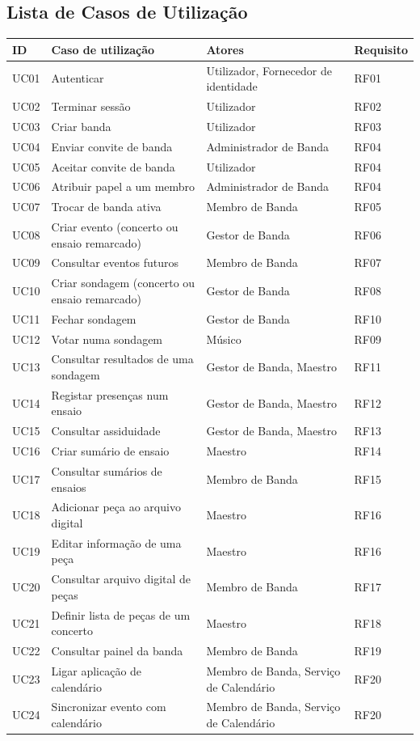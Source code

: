 \subsection{Lista de Casos de Utilização}
\begin{longtable}{|p{1.4cm}|p{5cm}|p{4.6cm}|p{2cm}|}
\hline
\textbf{ID} & \textbf{Caso de utilização} & \textbf{Atores} & \textbf{Requisito} \\ \hline
\endhead
UC01 & Autenticar & Utilizador, Fornecedor de identidade & RF01 \\ \hline
UC02 & Terminar sessão & Utilizador & RF02 \\ \hline
UC03 & Criar banda & Utilizador & RF03 \\ \hline
UC04 & Enviar convite de banda & Administrador de Banda & RF04 \\ \hline
UC05 & Aceitar convite de banda & Utilizador & RF04 \\ \hline
UC06 & Atribuir papel a um membro & Administrador de Banda & RF04 \\ \hline
UC07 & Trocar de banda ativa & Membro de Banda & RF05 \\ \hline
UC08 & Criar evento (concerto ou ensaio remarcado) & Gestor de Banda & RF06 \\ \hline
UC09 & Consultar eventos futuros & Membro de Banda & RF07 \\ \hline
UC10 & Criar sondagem (concerto ou ensaio remarcado) & Gestor de Banda & RF08 \\ \hline
UC11 & Fechar sondagem & Gestor de Banda & RF10 \\ \hline
UC12 & Votar numa sondagem & Músico & RF09 \\ \hline
UC13 & Consultar resultados de uma sondagem & Gestor de Banda, Maestro & RF11 \\ \hline
UC14 & Registar presenças num ensaio & Gestor de Banda, Maestro & RF12 \\ \hline
UC15 & Consultar assiduidade & Gestor de Banda, Maestro & RF13 \\ \hline
UC16 & Criar sumário de ensaio & Maestro & RF14 \\ \hline
UC17 & Consultar sumários de ensaios & Membro de Banda & RF15 \\ \hline
UC18 & Adicionar peça ao arquivo digital & Maestro & RF16 \\ \hline
UC19 & Editar informação de uma peça & Maestro & RF16 \\ \hline
UC20 & Consultar arquivo digital de peças & Membro de Banda & RF17 \\ \hline
UC21 & Definir lista de peças de um concerto & Maestro & RF18 \\ \hline
UC22 & Consultar painel da banda & Membro de Banda & RF19 \\ \hline
UC23 & Ligar aplicação de calendário & Membro de Banda, Serviço de Calendário & RF20 \\ \hline
UC24 & Sincronizar evento com calendário & Membro de Banda, Serviço de Calendário & RF20 \\ \hline
\end{longtable}

